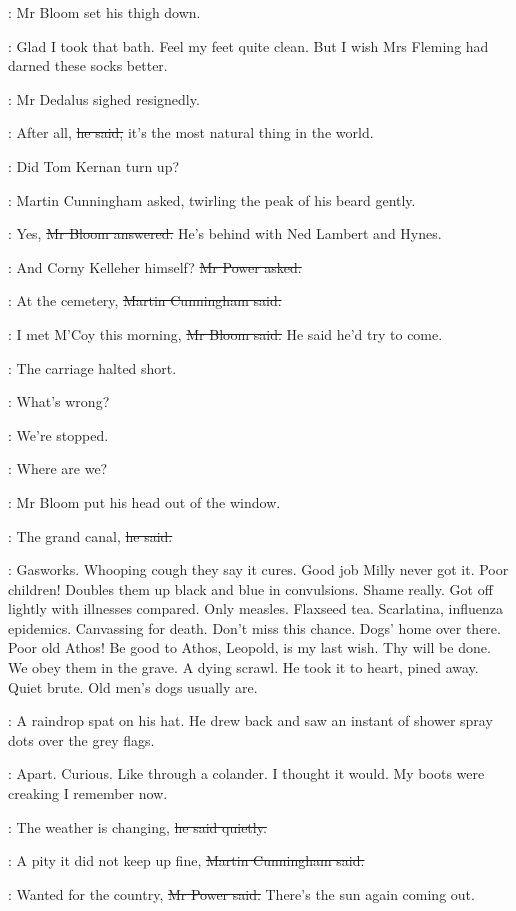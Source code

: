 :
Mr Bloom set his thigh down.

\BloomInt:
Glad I took that bath.
Feel my feet quite clean.
But I wish Mrs Fleming had darned these socks better.

:
Mr Dedalus sighed resignedly.

\simon:
After all,
\sout{he said,}
it's the most natural thing in the world.

\cunningham:
Did Tom Kernan turn up?

:
Martin Cunningham asked,
twirling the peak of his beard gently.

\Bloom:
Yes,
\sout{Mr Bloom answered.}
He's behind with Ned Lambert and Hynes.

\power:
And Corny Kelleher himself?
\sout{Mr Power asked.}

\cunningham:
At the cemetery,
\sout{Martin Cunningham said.}

\Bloom:
I met M'Coy this morning,
\sout{Mr Bloom said.}
He said he'd try to come.

:
The carriage halted short.

\simon:
What's wrong?

\power:
We're stopped.

\cunningham:
Where are we?

:
Mr Bloom put his head out of the window.

\Bloom:
The grand canal,
\sout{he said.}

\BloomInt:
Gasworks.
Whooping cough they say it cures.
Good job Milly never got it.
Poor children!
Doubles them up black and blue in convulsions.
Shame really.
Got off lightly with illnesses compared.
Only measles.
Flaxseed tea.
Scarlatina, influenza epidemics.
Canvassing for death.
Don't miss this chance.
Dogs' home over there.
Poor old Athos!
Be good to Athos, Leopold, is my last wish.
Thy will be done.
We obey them in the grave.
A dying scrawl.
He took it to heart, pined away.
Quiet brute.
Old men's dogs usually are.

:
A raindrop spat on his hat.
He drew back and saw an instant of shower spray dots over the grey flags.

\BloomInt:
Apart.
Curious.
Like through a colander.
I thought it would.
My boots were creaking I remember now.

\Bloom:
The weather is changing,
\sout{he said quietly.}

\cunningham:
A pity it did not keep up fine,
\sout{Martin Cunningham said.}

\power:
Wanted for the country,
\sout{Mr Power said.}
There's the sun again coming out.

